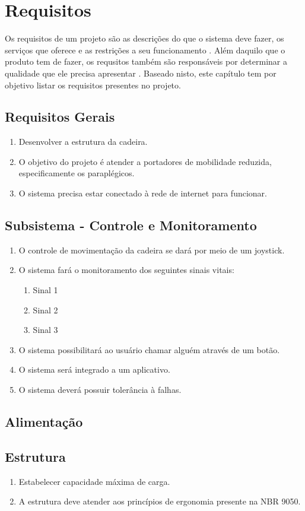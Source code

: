 \chapter{Requisitos}

Os requisitos de um projeto são as descrições do que o sistema deve fazer, os
serviços que oferece e as restrições a seu funcionamento \cite{sommerville}.
Além daquilo que o produto tem de fazer, os requsitos também são responsáveis
por determinar a qualidade que ele precisa apresentar \cite{robertson}.
Baseado nisto, este capítulo tem por objetivo listar os requisitos presentes
no projeto.

\section{Requisitos Gerais}

\begin{enumerate}
\item Desenvolver a estrutura da cadeira.
\item O objetivo do projeto é atender a portadores de mobilidade reduzida, especificamente os paraplégicos.
\item O sistema precisa estar conectado à rede de internet para funcionar.
\end{enumerate}

\section{Subsistema - Controle e Monitoramento}

\begin{enumerate}[resume*]
\item O controle de movimentação da cadeira se dará por meio de um joystick.
\item O sistema fará o monitoramento dos seguintes sinais vitais:
\begin{enumerate}[resume*]
\item Sinal 1
\item Sinal 2
\item Sinal 3
\end{enumerate}
\item O sistema possibilitará ao usuário chamar alguém através de um botão.
\item O sistema será integrado a um aplicativo.
\item O sistema deverá possuir tolerância à falhas.
\end{enumerate}

\section{Alimentação}

\section{Estrutura}

\begin{enumerate}[resume*]
\item Estabelecer capacidade máxima de carga.
\item A estrutura deve atender aos princípios de ergonomia presente na NBR 9050.
\end{enumerate}
